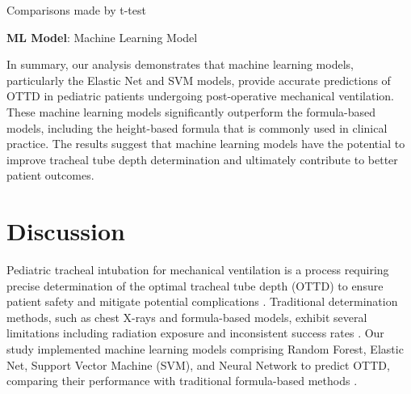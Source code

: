 \documentclass[11pt]{article}
\begin{document}
\begin{table}[h]
\caption{Pairwise Comparison of Machine Learning Models and Height-based Formula Model}
\label{table:model_t_test}
\begin{threeparttable}
\renewcommand{\TPTminimum}{\linewidth}
\begin{tablenotes}
\footnotesize
\item Comparisons made by t-test
\item \textbf{ML Model}: Machine Learning Model
\end{tablenotes}
\end{threeparttable}
\end{table}


In summary, our analysis demonstrates that machine learning models, particularly the Elastic Net and SVM models, provide accurate predictions of OTTD in pediatric patients undergoing post-operative mechanical ventilation. These machine learning models significantly outperform the formula-based models, including the height-based formula that is commonly used in clinical practice. The results suggest that machine learning models have the potential to improve tracheal tube depth determination and ultimately contribute to better patient outcomes.

\section*{Discussion}

Pediatric tracheal intubation for mechanical ventilation is a process requiring precise determination of the optimal tracheal tube depth (OTTD) to ensure patient safety and mitigate potential complications \cite{Shibasaki2010PredictionOP}. Traditional determination methods, such as chest X-rays and formula-based models, exhibit several limitations including radiation exposure and inconsistent success rates \cite{Shibasaki2010PredictionOP, Kerrey2009APC}. Our study implemented machine learning models comprising Random Forest, Elastic Net, Support Vector Machine (SVM), and Neural Network to predict OTTD, comparing their performance with traditional formula-based methods \cite{Kitabatake2005ECHOCARDIOGRAPHVDOPPLERNE, Ziemian2010GuideTS}.
\end{document}
